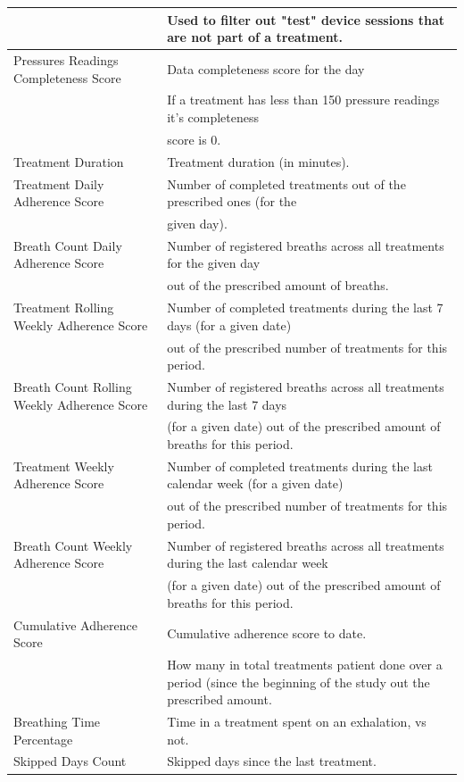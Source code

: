 \documentclass{article}
\begin{document}
\begin{table}[h]
\begin{tabular}{ |l|l| }
     ~ & Used to filter out "test" device sessions that are not part of a treatment. \\
     \midrule
     Pressures Readings Completeness Score & Data completeness score for the day \\
     ~ & If a treatment has less than 150 pressure readings it's completeness \\
     ~ & score is 0. \\
     \midrule
     Treatment Duration & Treatment duration (in minutes). \\
     \midrule
     Treatment Daily Adherence Score & Number of completed treatments out of the prescribed ones (for the \\
     ~ & given day). \\
     \midrule
     Breath Count Daily Adherence Score & Number of registered breaths across all treatments for the given day \\
     ~ & out of the prescribed amount of breaths. \\ 
     \midrule
     Treatment Rolling Weekly Adherence Score & Number of completed treatments during the last 7 days (for a given date) \\
     ~ & out of the prescribed number of treatments for this period. \\
     \midrule
     Breath Count Rolling Weekly Adherence Score & Number of registered breaths across all treatments during the last 7 days \\
     ~ & (for a given date) out of the prescribed amount of breaths for this period. \\ 
     \midrule
     Treatment Weekly Adherence Score & Number of completed treatments during the last calendar week (for a given date) \\
     ~ & out of the prescribed number of treatments for this period. \\
     \midrule
     Breath Count Weekly Adherence Score & Number of registered breaths across all treatments during the last calendar week \\
     ~ & (for a given date) out of the prescribed amount of breaths for this period.\\
     \midrule
     Cumulative Adherence Score & Cumulative adherence score to date. \\
     ~ & How many in total treatments patient done over a period (since the beginning of the study out the prescribed amount. \\
     \midrule
     Breathing Time Percentage & Time in a treatment spent on an exhalation, vs not.\\
     \midrule
     Skipped Days Count & Skipped days since the last treatment. \\
     \bottomrule
    \end{tabular}
\end{table}
\end{document}
